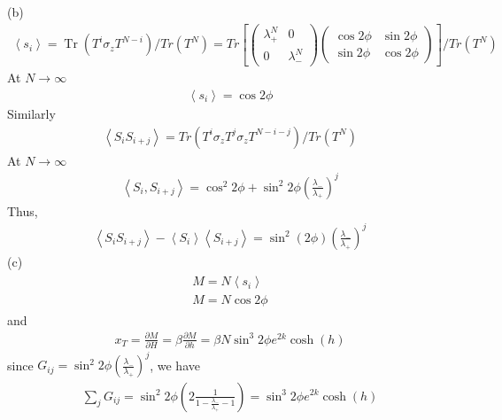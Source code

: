 \documentclass[12pt,titlepage]{article}
\numberwithin{equation}{section}
\begin{document}
(b)
\begin{align*}
\left\langle s_{i}\right\rangle=\operatorname{Tr}\left(T^{i} \sigma_{z} T^{N-i}\right) / Tr\left(T^{N}\right)= Tr\left[\left(\begin{array}{cc}{\lambda_{+}^N} & {0} \\ {0} & {\lambda_{-}^N}\end{array}\right)\left(\begin{array}{cc}{\cos 2\phi} & {\sin 2\phi} \\ {\sin 2\phi} & {\cos 2\phi}\end{array}\right)\right]/Tr(T^N)
\end{align*}
At $N \rightarrow \infty$ 
\begin{align*}
    \left\langle s_{i}\right\rangle=\cos 2\phi
\end{align*}
Similarly
\begin{align*}
    \left\langle S_{i} S_{i+j}\right\rangle=Tr\left(T^{i} \sigma_{z} T^{j}\sigma_{z} T^{N-i-j}\right)/Tr(T^N)
\end{align*}
At $N \rightarrow \infty$ 
\begin{align*}
    \left\langle S_{i}, S_{i+j}\right\rangle=\cos ^{2} 2 \phi+\sin ^{2} 2 \phi(\frac{\lambda_{-}}{\lambda_{+}})^j
\end{align*}
Thus,
\begin{align*}
    \left\langle S_{i} S_{i+j}\right\rangle-\left\langle S_{i}\right\rangle\left\langle S_{i+j}\right\rangle=\sin^2(2\phi)(\frac{\lambda_-}{\lambda_+})^j
\end{align*}
(c)
\begin{align*}
    \begin{array}{l}{M=N\left\langle s_{i}\right\rangle} \\ { M=N \cos 2 \phi}\end{array}
\end{align*}
and
\begin{align*}
    x_{T}=\frac{\partial M}{\partial H}=\beta \frac{\partial M}{\partial h}=\beta N \sin ^{3} 2 \phi e^{2 k} \cosh (h)
\end{align*}
since $G_{i j}=\sin ^{2} 2 \phi\left(\frac{\lambda_{-}}{\lambda_{+}}\right)^{j}$, we have
\begin{align*}
    \sum_{j} G_{i j}=\sin ^{2} 2 \phi\left(2\frac{1}{1-\frac{\lambda_-}{\lambda_+}-1}\right)= \sin ^{3} 2 \phi e^{2 k} \cosh (h)
\end{align*}
\end{document}
